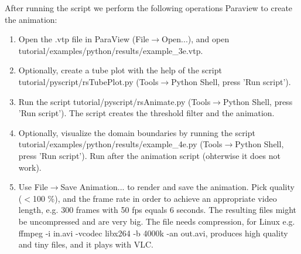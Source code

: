 After running the script we perform the following operations Paraview to create the animation:
\begin{enumerate}
 \item Open the .vtp file in ParaView (File$\rightarrow$Open...), and open tutorial/examples/python/results/example\_3e.vtp.
 \item Optionally, create a tube plot with the help of the script tutorial/pyscript/rsTubePlot.py (Tools$\rightarrow$Python Shell, press 'Run script').
 \item Run the script tutorial/pyscript/rsAnimate.py (Tools$\rightarrow$Python Shell, press 'Run script'). The script creates the threshold filter and the animation. 
 \item Optionally, visualize the domain boundaries by running the script tutorial/examples/python/results/example\_4e.py (Tools$\rightarrow$Python Shell, press 'Run script'). Run after the animation script (ohterwise it does not work).  
 \item Use File$\rightarrow$Save Animation... to render and save the animation. Pick quality ($<$100 \%), and the frame rate in order to achieve an appropriate video length, e.g. 300 frames with 50 fps equals 6 seconds. The resulting files might be uncompressed and are very big. The file needs compression, for Linux e.g. ffmpeg -i in.avi -vcodec libx264 -b 4000k -an out.avi, produces high quality and tiny files, and it plays with VLC.
\end{enumerate}




